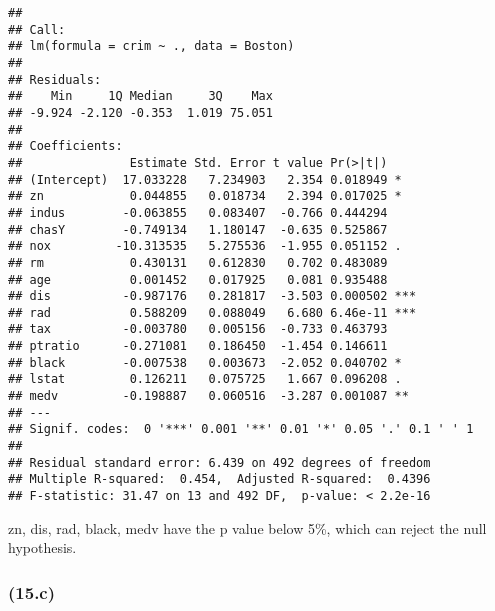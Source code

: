 \documentclass[]{article}
\newenvironment{Shaded}{\begin{snugshade}}{\end{snugshade}}
\newcommand{\DecValTok}[1]{\textcolor[rgb]{0.00,0.00,0.81}{#1}}
\newcommand{\KeywordTok}[1]{\textcolor[rgb]{0.13,0.29,0.53}{\textbf{#1}}}
\newcommand{\NormalTok}[1]{#1}
\newcommand{\OperatorTok}[1]{\textcolor[rgb]{0.81,0.36,0.00}{\textbf{#1}}}
\begin{document}
\begin{verbatim}
## 
## Call:
## lm(formula = crim ~ ., data = Boston)
## 
## Residuals:
##    Min     1Q Median     3Q    Max 
## -9.924 -2.120 -0.353  1.019 75.051 
## 
## Coefficients:
##               Estimate Std. Error t value Pr(>|t|)    
## (Intercept)  17.033228   7.234903   2.354 0.018949 *  
## zn            0.044855   0.018734   2.394 0.017025 *  
## indus        -0.063855   0.083407  -0.766 0.444294    
## chasY        -0.749134   1.180147  -0.635 0.525867    
## nox         -10.313535   5.275536  -1.955 0.051152 .  
## rm            0.430131   0.612830   0.702 0.483089    
## age           0.001452   0.017925   0.081 0.935488    
## dis          -0.987176   0.281817  -3.503 0.000502 ***
## rad           0.588209   0.088049   6.680 6.46e-11 ***
## tax          -0.003780   0.005156  -0.733 0.463793    
## ptratio      -0.271081   0.186450  -1.454 0.146611    
## black        -0.007538   0.003673  -2.052 0.040702 *  
## lstat         0.126211   0.075725   1.667 0.096208 .  
## medv         -0.198887   0.060516  -3.287 0.001087 ** 
## ---
## Signif. codes:  0 '***' 0.001 '**' 0.01 '*' 0.05 '.' 0.1 ' ' 1
## 
## Residual standard error: 6.439 on 492 degrees of freedom
## Multiple R-squared:  0.454,  Adjusted R-squared:  0.4396 
## F-statistic: 31.47 on 13 and 492 DF,  p-value: < 2.2e-16
\end{verbatim}

zn, dis, rad, black, medv have the p value below 5\%, which can reject
the null hypothesis.

\hypertarget{c-3}{%
\subsubsection{(15.c)}\label{c-3}}

\begin{Shaded}
\end{Shaded}
\end{document}
